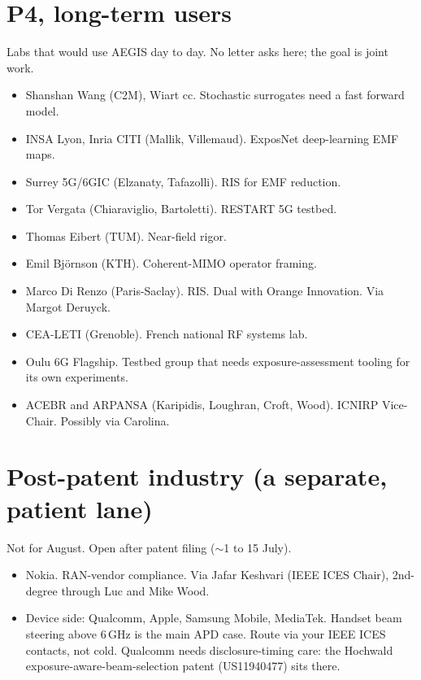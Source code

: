 \documentclass[11pt,a4paper]{article}
\begin{document}
\section{P4, long-term users}
Labs that would use AEGIS day to day. No letter asks here; the goal is joint work.
\begin{itemize}
  \item Shanshan Wang (C2M), Wiart cc. Stochastic surrogates need a fast forward model.
  \item INSA Lyon, Inria CITI (Mallik, Villemaud). ExposNet deep-learning EMF maps.
  \item Surrey 5G/6GIC (Elzanaty, Tafazolli). RIS for EMF reduction.
  \item Tor Vergata (Chiaraviglio, Bartoletti). RESTART 5G testbed.
  \item Thomas Eibert (TUM). Near-field rigor.
  \item Emil Bj\"ornson (KTH). Coherent-MIMO operator framing.
  \item Marco Di Renzo (Paris-Saclay). RIS. Dual with Orange Innovation. Via Margot Deruyck.
  \item CEA-LETI (Grenoble). French national RF systems lab.
  \item Oulu 6G Flagship. Testbed group that needs exposure-assessment tooling for its own experiments.
  \item ACEBR and ARPANSA (Karipidis, Loughran, Croft, Wood). ICNIRP Vice-Chair. Possibly via Carolina.
\end{itemize}

\section{Post-patent industry (a separate, patient lane)}
Not for August. Open after patent filing ($\sim$1 to 15 July).
\begin{itemize}
  \item Nokia. RAN-vendor compliance. Via Jafar Keshvari (IEEE ICES Chair), 2nd-degree through Luc and Mike Wood.
  \item Device side: Qualcomm, Apple, Samsung Mobile, MediaTek. Handset beam steering above 6\,GHz is the main APD case. Route via your IEEE ICES contacts, not cold. Qualcomm needs disclosure-timing care: the Hochwald exposure-aware-beam-selection patent (US11940477) sits there.
\end{itemize}
\end{document}
